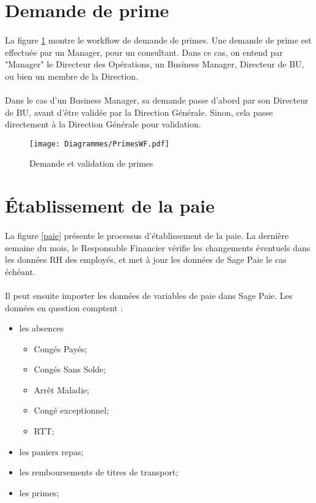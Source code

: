 \section{Demande de prime}
\paragraph{} La figure \ref{primes} montre le workflow de demande de primes. Une demande de prime est effectuée par un Manager, pour un consultant. Dans ce cas, on entend par "Manager" le Directeur des Opérations, un Business Manager, Directeur de BU, ou bien un membre de la Direction.
\paragraph{} Dans le cas d'un Business Manager, sa demande passe d'abord par son Directeur de BU, avant d'être validée par la Direction Générale. Sinon, cela passe directement à la Direction Générale pour validation.



\begin{figure}[H]
	\centering
	\texttt{[image: Diagrammes/PrimesWF.pdf]}
	\caption{Demande et validation de primes} 
	\label{primes}
\end{figure}

\section{Établissement de la paie}

\paragraph{} La figure \ref{paie} présente le processus d'établissement de la paie. La dernière semaine du mois, le Responsable Financier vérifie les changements éventuels dans les données RH des employés, et met à jour les données de Sage Paie le cas échéant.
\paragraph{} Il peut ensuite importer les données de variables de paie dans Sage Paie. Les données en question comptent : \begin{itemize}
	\item les absences \begin{itemize}
		\item Congés Payés;
		\item Congés Sans Solde;
		\item Arrêt Maladie;
		\item Congé exceptionnel;
		\item RTT;
	\end{itemize}
	\item les paniers repas;
	\item les remboursements de titres de transport;
	\item les primes;
\end{itemize}

